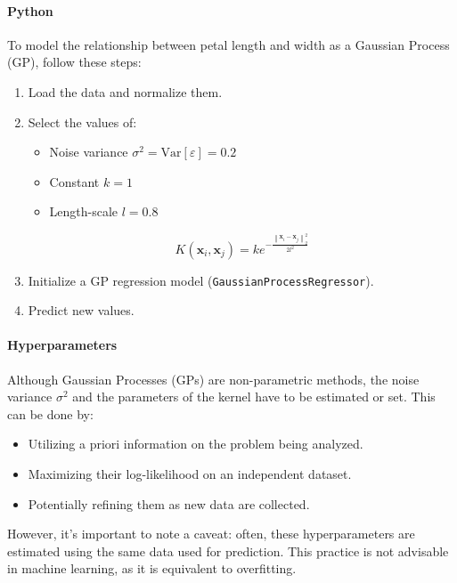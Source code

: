 \paragraph*{Python}
To model the relationship between petal length and width as a Gaussian Process (GP), follow these steps:
\begin{enumerate}
    \item Load the data and normalize them.
    \item Select the values of:
        \begin{itemize}
            \item Noise variance $\sigma^2 = \text{Var}[\varepsilon] = 0.2$
            \item Constant $k = 1$
            \item Length-scale $l = 0.8$
        \end{itemize}
        \[K(\mathbf{x}_i,\mathbf{x}_j)=ke^{-\frac{\left\lVert \mathbf{x}_i-\mathbf{x}_j \right\rVert _2^2 }{2l^2}}\]
    \item Initialize a GP regression model (\texttt{GaussianProcessRegressor}).
    \item Predict new values.
\end{enumerate}

\paragraph*{Hyperparameters}
Although Gaussian Processes (GPs) are non-parametric methods, the noise variance $\sigma^2$ and the parameters of the kernel have to be estimated or set. 
This can be done by:
\begin{itemize}
    \item Utilizing a priori information on the problem being analyzed.
    \item Maximizing their log-likelihood on an independent dataset.
    \item Potentially refining them as new data are collected.
\end{itemize}
However, it's important to note a caveat: often, these hyperparameters are estimated using the same data used for prediction. 
This practice is not advisable in machine learning, as it is equivalent to overfitting.
